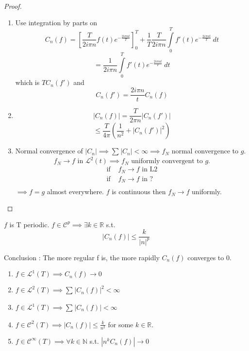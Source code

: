 \begin{proof}
    \begin{enumerate}
        \item Use integration by parts on 
            \[
                C_n(f) = \left[ \frac{ T }{ 2i\pi n } f(t)e^ {-\frac{2i\pi nt  }{ T }}
                \right]^T_0 + \frac{ 1 }{ T } \frac{ T }{ 2i\pi n } \int\limits_{0 }^{T}
                f'(t) e^ {- \frac{ 2i\pi nt }{ T } } \ dt 
            \] 
            \[
                = \frac{ 1 }{ 2i\pi n  } \int\limits_{0}^{T} f'(t)e^{- \frac{ 2i\pi nt }{
                T} } \ dt  
            \]    
            which is $ TC_n(f')  $
            and 
            \[
                C_n(f') = \frac{ 2i\pi n  }{ t } C_n(f)
            \]
        \item
            \[
                \left | C_n(f)  \right | = \frac{ T }{ 2\pi n  } \left | C_n\left( f'\right)  \right | 
            \]
            \[
                \leq \frac{ T }{ 4\pi  } \left( \frac{ 1 }{ n^2 } + \left | C_n(f')
                \right |^2 \right) 
            \]

        \item Normal convergence of $ \left | C_n \right | \implies \sum_{}^{} \left | C_n
            \right | < \infty \implies f_N $ normal convergence to $ g $. 
            \[
                f_N \to f \text{ in } \mathscr{ L } ^2(t) \implies f_N \text{ uniformly
                convergent to } g.
            \]
            \begin{align*}
                \text{ if }  &f_N \to f \text{ in L2 }   \\
                \text{ if }  &f_N \to f \text{ in ? }   \\
            \end{align*} $ \implies  f = g$ almost everywhere. 
            $ f $ is continuous then $ f_N \to f $ uniformly. 
    \end{enumerate}
\end{proof}

\begin{ftheo}
    $ f $ is T periodic. $ f \in \mathscr{ C }^p \implies \exists k \in \mathbb{R}  $ s.t. 
    \[
        \left | C_n(f) \right | \leq \frac{ k }{ \left | n  \right | ^p } 
    \]
    \label{th:Regularity Theorem}
\end{ftheo}
Conclusion : 
The more regular f is, the more rapidly $ C_n(f) $ converges to 0. 
\begin{enumerate}
    \item $ f \in \mathscr{ L } ^1(T) \implies C_n(f) \to 0 $
    \item $ f \in \mathscr{ L } ^2(T) \implies \sum_{}^{} \left | C_n(f) \right | ^2 <
        \infty $
    \item $ f \in \mathscr{ L } ^1(T) \implies \sum_{}^{} \left | C_n(f) \right | <
        \infty $
    \item $ f \in \mathscr{ C } ^2(T) \implies \left | C_n(f) \right | \leq \frac{ k }{
        n^2 }  $ for some $ k \in \mathbb{R}  $. 
    \item $ f \in \mathscr{ C } ^\infty(T) \implies \forall k \in \mathbb{N}  $ s.t. $ \left |
        n^kC_n(f)\right | \to 0 $ 
\end{enumerate}


